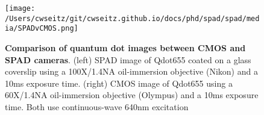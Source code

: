 



\begin{figure*}[t]
\centering
\texttt{[image: /Users/cwseitz/git/cwseitz.github.io/docs/phd/spad/spad/media/SPADvCMOS.png]}
\caption{\textbf{Comparison of quantum dot images between CMOS and SPAD cameras}. (left) SPAD image of Qdot655 coated on a glass coverslip using a 100X/1.4NA oil-immersion objective (Nikon) and a 10ms exposure time. (right) CMOS image of Qdot655 using a 60X/1.4NA oil-immersion objective (Olympus) and a 10ms exposure time. Both use continuous-wave 640nm excitation}
\label{fig:fig4}
\end{figure*}    

